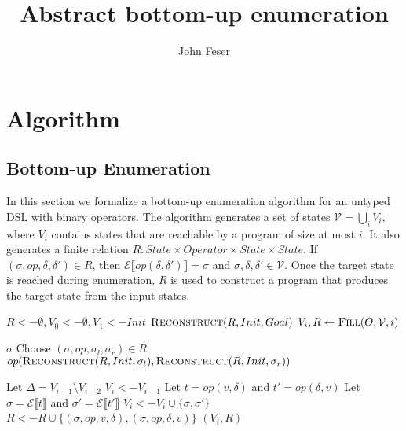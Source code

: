 \documentclass[authordraft,acmsmall,10pt]{acmart}
\renewcommand{\eval}[1]{\ensuremath{\mathcal{E}\llbracket#1\rrbracket}}
\begin{document}
\author{John Feser}
\title{Abstract bottom-up enumeration}
\maketitle

\section{Algorithm}
\subsection{Bottom-up Enumeration}

In this section we formalize a bottom-up enumeration algorithm for an untyped
DSL with binary operators. The algorithm generates a set of states $\mathcal{V}
= \bigcup_i V_i$, where $V_i$ contains states that are reachable by a program of
size at most $i$. It also generates a finite relation $R : State \times Operator
\times State \times State$. If $(\sigma, op, \delta, \delta') \in R$, then
$\eval{op(\delta, \delta')} = \sigma$ and $\sigma, \delta, \delta' \in
\mathcal{V}$. Once the target state is reached during enumeration, $R$ is used
to construct a program that produces the target state from the input states.

\begin{algorithm}
  \begin{algorithmic}[1]
    \State $R <- \emptyset, V_0 <- \emptyset, V_1 <- Init$
    \State \Return $\Call{Reconstruct}{R, Init, Goal}$
    \EndIf
    \State $V_i, R <- \Call{Fill}{O, \mathcal{V}, i}$
    \EndFor
    \EndFunction
  \end{algorithmic}
\end{algorithm}

\begin{algorithm}
  \begin{algorithmic}[1]
    \State \Return $\sigma$
    \EndIf
    \State Choose $(\sigma, op, \sigma_l, \sigma_r) \in R$
    \State \Return $op(\Call{Reconstruct}{R, Init, \sigma_l},
    \Call{Reconstruct}{R, Init, \sigma_r})$
    \EndFunction
  \end{algorithmic}

  \begin{algorithmic}[1]
    \State Let $\Delta = V_{i - 1} \setminus V_{i - 2}$
    \State $V_i <- V_{i - 1}$
    \State Let $t = op(v, \delta)$ and $t' = op(\delta, v)$
    \State Let $\sigma = \eval{t}$ and $\sigma' = \eval{t'}$
    \State $V_i <- V_i \cup \{\sigma, \sigma'\}$
    \State $R <- R \cup \{(\sigma, op, v, \delta), (\sigma, op, \delta, v)\}$
    \EndFor
    \State \Return $(V_i, R)$
    \EndFunction
  \end{algorithmic}
\end{algorithm}
\end{document}
